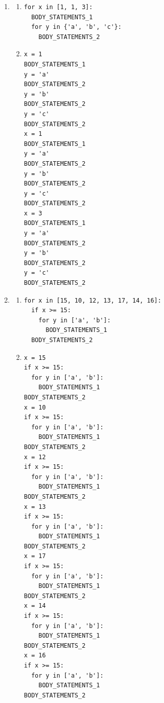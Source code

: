 \documentclass{article}
\begin{document}
\begin{enumerate}
    \item
    \begin{enumerate}
      \item
\begin{verbatim}
for x in [1, 1, 3]:
  BODY_STATEMENTS_1
  for y in {'a', 'b', 'c'}:
    BODY_STATEMENTS_2
\end{verbatim}
      \item
\begin{verbatim}
x = 1
BODY_STATEMENTS_1
y = 'a'
BODY_STATEMENTS_2
y = 'b'
BODY_STATEMENTS_2
y = 'c'
BODY_STATEMENTS_2
x = 1
BODY_STATEMENTS_1
y = 'a'
BODY_STATEMENTS_2
y = 'b'
BODY_STATEMENTS_2
y = 'c'
BODY_STATEMENTS_2
x = 3
BODY_STATEMENTS_1
y = 'a'
BODY_STATEMENTS_2
y = 'b'
BODY_STATEMENTS_2
y = 'c'
BODY_STATEMENTS_2
\end{verbatim}
    \end{enumerate}


    \item
    \begin{enumerate}
      \item
\begin{verbatim}
for x in [15, 10, 12, 13, 17, 14, 16]:
  if x >= 15:
    for y in ['a', 'b']:
      BODY_STATEMENTS_1
  BODY_STATEMENTS_2
\end{verbatim}
      \item
\begin{verbatim}
x = 15
if x >= 15:
  for y in ['a', 'b']:
    BODY_STATEMENTS_1
BODY_STATEMENTS_2
x = 10
if x >= 15:
  for y in ['a', 'b']:
    BODY_STATEMENTS_1
BODY_STATEMENTS_2
x = 12
if x >= 15:
  for y in ['a', 'b']:
    BODY_STATEMENTS_1
BODY_STATEMENTS_2
x = 13
if x >= 15:
  for y in ['a', 'b']:
    BODY_STATEMENTS_1
BODY_STATEMENTS_2
x = 17
if x >= 15:
  for y in ['a', 'b']:
    BODY_STATEMENTS_1
BODY_STATEMENTS_2
x = 14
if x >= 15:
  for y in ['a', 'b']:
    BODY_STATEMENTS_1
BODY_STATEMENTS_2
x = 16
if x >= 15:
  for y in ['a', 'b']:
    BODY_STATEMENTS_1
BODY_STATEMENTS_2
\end{verbatim}
    \end{enumerate}


\end{enumerate}
\end{document}
